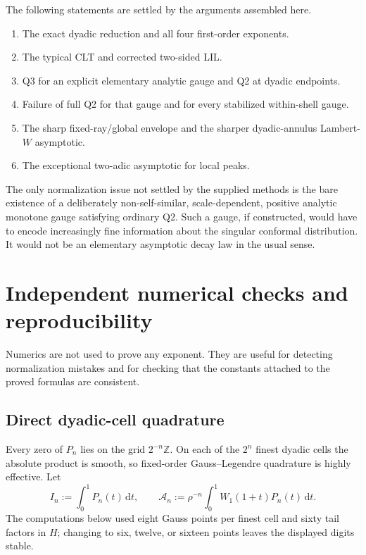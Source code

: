 \documentclass[11pt,oneside]{article}
\theoremstyle{definition}
\theoremstyle{remark}
\newcommand{\Z}{\mathbb Z}
\newcommand{\dd}{\,\mathrm d}
\begin{document}
The following statements are settled by the arguments assembled here.
\begin{enumerate}
 \item The exact dyadic reduction and all four first-order exponents.
 \item The typical CLT and corrected two-sided LIL.
 \item Q3 for an explicit elementary analytic gauge and Q2 at dyadic endpoints.
 \item Failure of full Q2 for that gauge and for every stabilized within-shell
 gauge.
 \item The sharp fixed-ray/global envelope and the sharper dyadic-annulus
 Lambert-$W$ asymptotic.
 \item The exceptional two-adic asymptotic for local peaks.
\end{enumerate}
The only normalization issue not settled by the supplied methods is the bare
existence of a deliberately non-self-similar, scale-dependent, positive
analytic monotone gauge satisfying ordinary Q2.  Such a gauge, if constructed,
would have to encode increasingly fine information about the singular
conformal distribution.  It would not be an elementary asymptotic decay law
in the usual sense.

\section{Independent numerical checks and reproducibility}
\label{sec:numerics}

Numerics are not used to prove any exponent.  They are useful for detecting
normalization mistakes and for checking that the constants attached to the
proved formulas are consistent.

\subsection{Direct dyadic-cell quadrature}

Every zero of $P_n$ lies on the grid $2^{-n}\Z$.  On each of the $2^n$ finest
dyadic cells the absolute product is smooth, so fixed-order Gauss--Legendre
quadrature is highly effective.  Let
\begin{equation}
 I_n:=\int_0^1P_n(t)\dd t,
 \qquad
 \mathcal A_n:=\rho^{-n}\int_0^1W_1(1+t)P_n(t)\dd t.
 \label{eq:numeric-sequences}
\end{equation}
The computations below used eight Gauss points per finest cell and sixty tail
factors in $H$; changing to six, twelve, or sixteen points leaves the displayed
digits stable.
\end{document}

